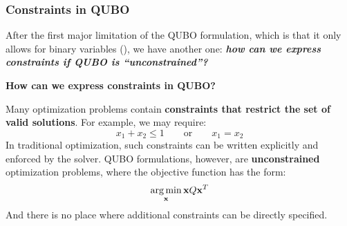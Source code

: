 \subsubsection{Constraints in QUBO}\label{sec:constraints-in-qubo}

After the first major limitation of the QUBO formulation, which is that it only allows for binary variables (), we have another one: \emph{\textbf{how can we express constraints if QUBO is ``unconstrained''?}}

\highspace
\begin{flushleft}
    \textcolor{Red2}{ \textbf{How can we express constraints in QUBO?}}
\end{flushleft}
Many optimization problems contain \textbf{constraints that restrict the set of valid solutions}. For example, we may require:
\begin{equation*}
    x_{1} + x_{2} \le 1 \qquad \text{or} \qquad x_{1} = x_{2}
\end{equation*}
In traditional optimization, such constraints can be written explicitly and enforced by the solver. QUBO formulations, however, are \textbf{unconstrained} optimization problems, where the objective function has the form:
\begin{equation*}
    \operatorname*{arg\,min}_{\mathbf{x}} \mathbf{x}Q\mathbf{x}^T
\end{equation*}
And there is no place where additional constraints can be directly specified.

